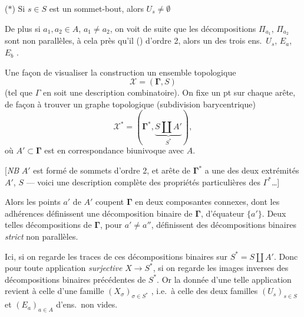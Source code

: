 \documentclass[11pt,a4paper]{article}
\begin{document}
($*$) Si $s\in S$ est un sommet-bout, alors $U_{s}\neq\emptyset$

De plus si $a_{1},a_{2}\in A$, $a_{1}\neq a_{2}$, on voit de suite que les
décompositions $\Pi_{a_{1}}$, $\Pi_{a_{2}}$ sont non parallèles, à cela près
qu'il  (\uncertain{**}) 
 \ill{} d'ordre 2, alors un des trois
ens.\ $U_{s}$, $E_{a}$, $E_{b}$ .

Une façon de visualiser la construction  un ensemble
topologique
\[
  \mathcal{X}=(\boldsymbol{\Gamma},S)
\]
(tel que $\Gamma$ en soit une description combinatoire). On fixe un pt sur
chaque arête, de façon à trouver un graphe topologique (subdivision
barycentrique)
\[
  \mathcal{X}^{*}=(\boldsymbol{\Gamma}^{*},\underbrace{S\amalg A'}_{S^{*}}),
\]
où $A'\subset\boldsymbol{\Gamma}$ est en correspondance biunivoque
 avec \struck{\ill{}} $A$.

\struck{\ill{}} [\emph{NB} $A'$ est formé de  sommets d'ordre 2,
et  arête de $\boldsymbol{\Gamma}^{*}$ a une
 des deux extrémités  $A'$,
 \ill{} $S$ — voici une description complète des
propriétés particulières des $\Gamma^{*}$…]

Alors les points $a'$ de $A'$ coupent $\boldsymbol{\Gamma}$ en deux
composantes connexes, dont les adhérences définissent une décomposition
binaire de $\boldsymbol{\Gamma}$, d'équateur $\{a'\}$. Deux telles
décompositions de $\boldsymbol{\Gamma}$, pour $a'\neq a''$, définissent des
décompositions binaires \emph{strict} non parallèles.

Ici, si on regarde les traces de ces décompositions binaires sur
$S^{*}=S\amalg A'$. Donc pour toute application \emph{surjective}
$X\longrightarrow S^{*}$, si on regarde les images inverses des décompositions
binaires précédentes de $S^{*}$. Or la donnée d'une telle application revient
à celle d'une famille $(X_{\sigma})_{\sigma\in S^{*}}$
 , i.e.\ à
celle des deux familles $(U_{s})_{s\in S}$ et $(E_{a})_{a\in A}$ d'ens.\ non
vides.
\end{document}

